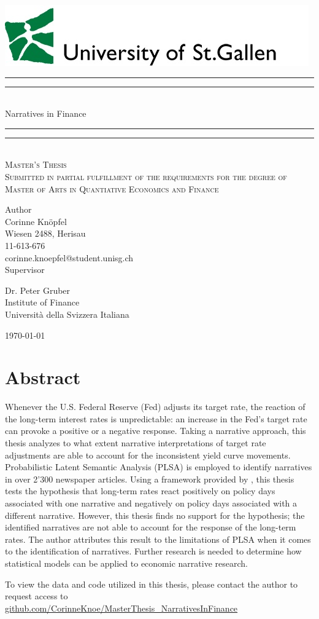 \documentclass[11pt,a4paper,english,oneside]{book}
\makeatletter
\newcommand{\githubSymbol}{\faGithub}
\newcommand\link[2]{\color{black}\href{#1}{#2}\color{black} }
\newcommand*{\github}[1]{\sociallink{\githubSymbol}{https://www.github.com/#1}{github.com/#1}}
\newcommand{\sociallink}[3]{\mbox{\textcolor{black}{#1}\hspace{0.5em}\link{#2}{#3}\hspace{1em}}}
\newcommand*{\plogo}{\includegraphics[scale=0.7]{Images/HSG_logo}}
\numberwithin{equation}{chapter}
\newcommand*{\titleGP}{\begingroup %
\centering %
\vspace*{\baselineskip} %
\plogo\\[2\baselineskip] %
\rule{\textwidth}{1.6pt}\vspace*{-\baselineskip}\vspace*{2pt} %
\rule{\textwidth}{0.4pt}\\[\baselineskip] %
{\LARGE Narratives in Finance }\\[0.2\baselineskip] %
\rule{\textwidth}{0.4pt}\vspace*{-\baselineskip}\vspace{3.2pt} %
\rule{\textwidth}{1.6pt}\\[2\baselineskip] %
\scshape %
Master's Thesis\\[2\baselineskip]
Submitted in partial fulfillment of the requirements for the degree of Master of Arts in Quantiative Economics and Finance \par
\vspace*{2\baselineskip}
Author\\
{\Large Corinne Knöpfel \\ [5pt]
 }
Wiesen 2488, Herisau \\[5pt]
11-613-676\\[5pt]
corinne.knoepfel@student.unisg.ch \\


\vspace*{2\baselineskip}
Supervisor\\
{\Large Dr. Peter Gruber\\[5pt]%
\small Institute of Finance\\[5pt]Universit\`{a} della Svizzera Italiana\par}
\vfill
{\scshape %
	\today } \\[0.3\baselineskip]
\endgroup}
\makeatother
\begin{document}
\thispagestyle{empty}
\titleGP
\newpage
\doublespacing
\setcounter{page}{1}
\thispagestyle{firststyle}


\chapter*{Abstract}
Whenever the U.S. Federal Reserve (Fed) adjusts its target rate, the reaction of the long-term interest rates is unpredictable: an increase in the Fed's target rate can provoke a positive or a negative response. Taking a narrative approach, this thesis analyzes to what extent narrative interpretations of target rate adjustments are able to account for the inconsistent yield curve movements. 
Probabilistic Latent Semantic Analysis (PLSA) is employed to identify narratives in over 2'300 newspaper articles. Using a framework provided by \citet{Ellingsen.2003}, this thesis tests the hypothesis that long-term rates react positively on policy days associated with one narrative and negatively on policy days associated with a different narrative. However, this thesis finds no support for the hypothesis; the identified narratives are not able to account for the response of the long-term rates. The author attributes this result to the limitations of PLSA when it comes to the identification of narratives. Further research is needed to determine how statistical models can be applied to economic narrative research. 

\vspace*{\fill}

\noindent To view the data and code utilized in this thesis, please contact the author to request access to \\
\noindent \github{CorinneKnoe/MasterThesis\_NarrativesInFinance}



{\pagestyle{firststyle}
\tableofcontents
\cleardoublepage
}

\listoffigures
\listoftables

\newpage
\end{document}
